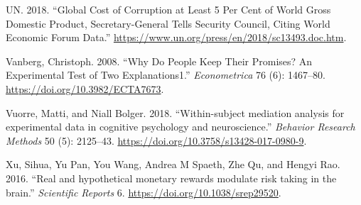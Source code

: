 \documentclass[smallextended]{svjour3}       %
\begin{document}
\leavevmode\hypertarget{ref-UN2018}{}%
UN. 2018. ``Global Cost of Corruption at Least 5 Per Cent of World Gross
Domestic Product, Secretary-General Tells Security Council, Citing World
Economic Forum Data.''
\url{https://www.un.org/press/en/2018/sc13493.doc.htm}.

\leavevmode\hypertarget{ref-Vanberg2008}{}%
Vanberg, Christoph. 2008. ``Why Do People Keep Their Promises? An
Experimental Test of Two Explanations1.'' \emph{Econometrica} 76 (6):
1467--80. \url{https://doi.org/10.3982/ECTA7673}.

\leavevmode\hypertarget{ref-Vuorre2018}{}%
Vuorre, Matti, and Niall Bolger. 2018. ``Within-subject mediation
analysis for experimental data in cognitive psychology and
neuroscience.'' \emph{Behavior Research Methods} 50 (5): 2125--43.
\url{https://doi.org/10.3758/s13428-017-0980-9}.

\leavevmode\hypertarget{ref-Xu2016}{}%
Xu, Sihua, Yu Pan, You Wang, Andrea M Spaeth, Zhe Qu, and Hengyi Rao.
2016. ``Real and hypothetical monetary rewards modulate risk taking in
the brain.'' \emph{Scientific Reports} 6.
\url{https://doi.org/10.1038/srep29520}.



\end{document}
